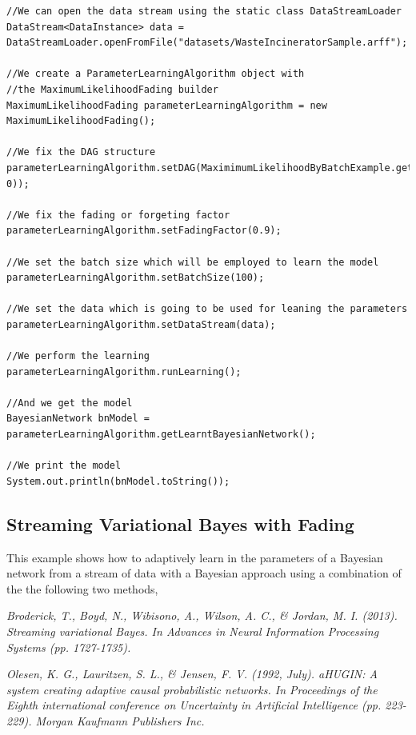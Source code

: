 \begin{lstlisting}
//We can open the data stream using the static class DataStreamLoader
DataStream<DataInstance> data = DataStreamLoader.openFromFile("datasets/WasteIncineratorSample.arff");

//We create a ParameterLearningAlgorithm object with 
//the MaximumLikelihoodFading builder
MaximumLikelihoodFading parameterLearningAlgorithm = new MaximumLikelihoodFading();

//We fix the DAG structure
parameterLearningAlgorithm.setDAG(MaximimumLikelihoodByBatchExample.getNaiveBayesStructure(data, 0));

//We fix the fading or forgeting factor
parameterLearningAlgorithm.setFadingFactor(0.9);

//We set the batch size which will be employed to learn the model
parameterLearningAlgorithm.setBatchSize(100);

//We set the data which is going to be used for leaning the parameters
parameterLearningAlgorithm.setDataStream(data);

//We perform the learning
parameterLearningAlgorithm.runLearning();

//And we get the model
BayesianNetwork bnModel = parameterLearningAlgorithm.getLearntBayesianNetwork();

//We print the model
System.out.println(bnModel.toString());
\end{lstlisting}

\subsection{Streaming Variational Bayes with Fading}

This example shows how to adaptively learn in the parameters of a Bayesian network from a stream of data with a Bayesian approach using a combination of the the following two methods,

\textit{Broderick, T., Boyd, N., Wibisono, A., Wilson, A. C., \& Jordan, M. I. (2013). Streaming variational Bayes. 
In Advances in Neural Information Processing Systems (pp. 1727-1735).}

\textit{Olesen, K. G., Lauritzen, S. L., \& Jensen, F. V. (1992, July). aHUGIN: A system creating adaptive causal probabilistic networks. In Proceedings of the Eighth international conference on Uncertainty in Artificial Intelligence (pp. 223-229). Morgan Kaufmann Publishers Inc.}

